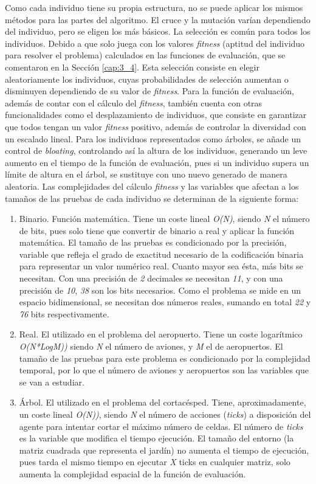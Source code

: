Como cada individuo tiene su propia estructura, no se puede aplicar los mismos métodos para las partes del algoritmo. El cruce y la mutación varían dependiendo del individuo, pero se eligen los más básicos. La selección es común para todos los individuos. Debido a que solo juega con los valores \textit{fitness} (aptitud del individuo para resolver el problema) calculados en las funciones de evaluación, que se comentaron en la Sección \ref{cap:3_4}. Esta selección consiste en elegir aleatoriamente los individuos, cuyas probabilidades de selección aumentan o disminuyen dependiendo de su valor de \textit{fitness}. Para la función de evaluación, además de contar con el cálculo del \textit{fitness}, también cuenta con otras funcionalidades como el desplazamiento de individuos, que consiste en garantizar que todos tengan un valor \textit{fitness} positivo, además de controlar la diversidad con un escalado lineal. Para los individuos representados como árboles, se añade un control de \textit{bloating}, controlando así la altura de los individuos, generando un leve aumento en el tiempo de la función de evaluación, pues si un individuo supera un límite de altura en el árbol, se sustituye con uno nuevo generado de manera aleatoria. Las complejidades del cálculo \textit{fitness} y las variables que afectan a los tamaños de las pruebas de cada individuo se determinan de la siguiente forma:
\begin{enumerate}
	\item Binario. Función matemática. Tiene un coste lineal \textit{O(N)}, siendo \textit{N} el número de bits, pues solo tiene que convertir de binario a real y aplicar la función matemática. El tamaño de las pruebas es condicionado por la precisión, variable que refleja el grado de exactitud necesario de la codificación binaria para representar un valor numérico real. Cuanto mayor sea ésta, más bits se necesitan. Con una precisión de \textit{2} decimales se necesitan \textit{11}, y con una precisión de \textit{10}, \textit{38} son los bits necesarios. Como el problema se mide en un espacio bidimensional, se necesitan dos números reales, sumando en total \textit{22} y \textit{76} bits respectivamente. 
	\item Real. El utilizado en el problema del aeropuerto. Tiene un coste logarítmico \textit{O(N*LogM))} siendo \textit{N} el número de aviones, y \textit{M} el de aeropuertos. El tamaño de las pruebas para este problema es condicionado por la complejidad temporal, por lo que el número de aviones y aeropuertos son las variables que se van a estudiar.						
	\item Árbol. El utilizado en el problema del cortacésped. Tiene, aproximadamente, un coste lineal \textit{O(N))}, siendo \textit{N} el número de acciones (\textit{ticks}) a disposición del agente para intentar cortar el máximo número de celdas. El número de \textit{ticks} es la variable que modifica el tiempo ejecución. El tamaño del entorno (la matriz cuadrada que representa el jardín) no aumenta el tiempo de ejecución, pues tarda el mismo tiempo en ejecutar \textit{X} ticks en cualquier matriz, solo aumenta la complejidad espacial de la función de evaluación. 
\end{enumerate}



